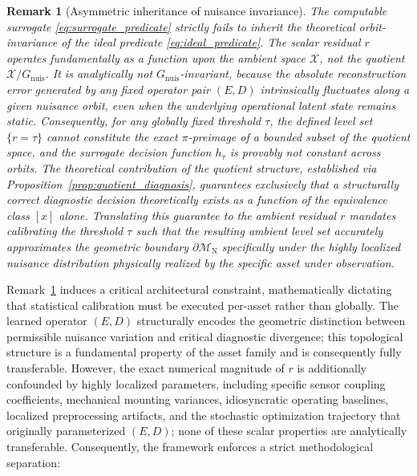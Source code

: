 \documentclass[a4paper]{cas-sc}
\newtheorem{remark}{Remark}
\newcommand{\X}{\ensuremath{\mathcal{X}}}
\newcommand{\Mnominal}{\ensuremath{\mathcal{M}_{\mathrm{N}}}}
\newcommand{\Gnuis}{\ensuremath{G_{\mathrm{nuis}}}}
\newcommand{\quotient}{\ensuremath{\mathcal{X}/G_{\mathrm{nuis}}}}
\newcommand{\residual}{\ensuremath{r}}
\begin{document}
\begin{remark}[Asymmetric inheritance of nuisance invariance]
\label{rem:scale_not_invariant}
The computable surrogate \eqref{eq:surrogate_predicate} strictly fails to inherit the theoretical orbit-invariance of the ideal predicate \eqref{eq:ideal_predicate}. The scalar residual \(\residual\) operates fundamentally as a function upon the ambient space \(\X\), not the quotient \(\quotient\). It is analytically not \(\Gnuis\)-invariant, because the absolute reconstruction error generated by any fixed operator pair \((E,D)\) intrinsically fluctuates along a given nuisance orbit, even when the underlying operational latent state remains static. Consequently, for any globally fixed threshold \(\tau\), the defined level set \(\{\residual = \tau\}\) cannot constitute the exact \(\pi\)-preimage of a bounded subset of the quotient space, and the surrogate decision function \(h_\tau\) is provably not constant across orbits. The theoretical contribution of the quotient structure, established via Proposition~\ref{prop:quotient_diagnosis}, guarantees exclusively that a structurally \emph{correct} diagnostic decision theoretically exists as a function of the equivalence class \([x]\) alone. Translating this guarantee to the ambient residual \(\residual\) mandates calibrating the threshold \(\tau\) such that the resulting ambient level set accurately approximates the geometric boundary \(\partial\Mnominal\) specifically under the highly localized nuisance distribution physically realized by the specific asset under observation.
\end{remark}

Remark~\ref{rem:scale_not_invariant} induces a critical architectural constraint, mathematically dictating that statistical calibration must be executed per-asset rather than globally. The learned operator \((E,D)\) structurally encodes the geometric distinction between permissible nuisance variation and critical diagnostic divergence; this topological structure is a fundamental property of the asset family and is consequently fully transferable. However, the exact numerical magnitude of \(\residual\) is additionally confounded by highly localized parameters, including specific sensor coupling coefficients, mechanical mounting variances, idiosyncratic operating baselines, localized preprocessing artifacts, and the stochastic optimization trajectory that originally parameterized \((E,D)\); none of these scalar properties are analytically transferable. Consequently, the framework enforces a strict methodological separation:
\end{document}
